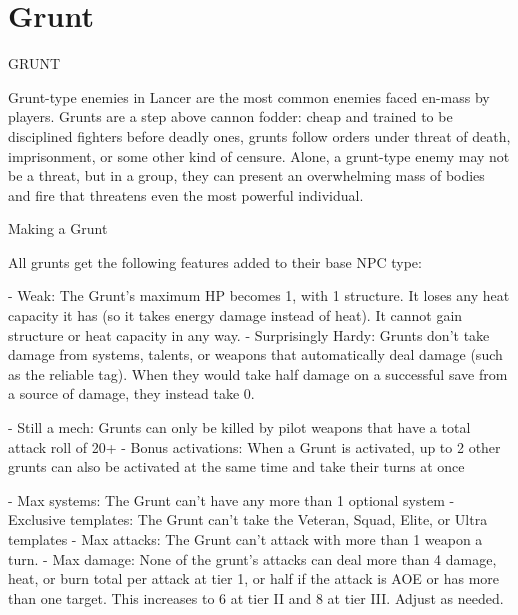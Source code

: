 \section{Grunt}
                                                 GRUNT

Grunt-type enemies in Lancer are the most common enemies faced en-mass by players. Grunts
are a step above cannon fodder: cheap and trained to be disciplined fighters before deadly ones,
grunts follow orders under threat of death, imprisonment, or some other kind of censure. Alone, a
grunt-type enemy may not be a threat, but in a group, they can present an overwhelming mass of
bodies and fire that threatens even the most powerful individual.

Making a Grunt

All grunts get the following features added to their base NPC type:

    -   Weak: The Grunt’s maximum HP becomes 1, with 1 structure. It loses any heat capacity it
         has (so it takes energy damage instead of heat). It cannot gain structure or heat capacity
         in any way.
    -   Surprisingly Hardy: Grunts don’t take damage from systems, talents, or weapons that
        automatically deal damage (such as the reliable tag). When they would take half damage
        on a successful save from a source of damage, they instead take 0.

    -   Still a mech: Grunts can only be killed by pilot weapons that have a total attack roll of
        20+
    -    Bonus activations: When a Grunt is activated, up to 2 other grunts can also be activated
        at the same time and take their turns at once

    -    Max systems: The Grunt can’t have any more than 1 optional system
    -    Exclusive templates: The Grunt can’t take the Veteran, Squad, Elite, or Ultra templates
    -    Max attacks: The Grunt can’t attack with more than 1 weapon a turn.
    -    Max damage: None of the grunt’s attacks can deal more than 4 damage, heat, or burn
        total per attack at tier 1, or half if the attack is AOE or has more than one target. This
         increases to 6 at tier II and 8 at tier III. Adjust as needed.
